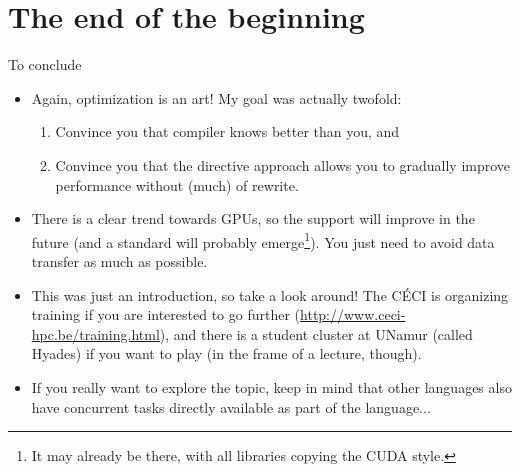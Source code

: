 \section{The end of the beginning}

\begin{frame}{To conclude}
	\begin{itemize}
		\item Again, optimization is an art! My goal was actually twofold:\begin{enumerate}
			\item Convince you that compiler knows better than you, and
			\item Convince you that the directive approach allows you to gradually improve performance without (much) of rewrite.
		\end{enumerate}
		\item There is a clear trend towards GPUs, so the support will improve in the future (and a standard will probably emerge\footnote{It may already be there, with all libraries copying the CUDA style.}). You just need to avoid data transfer as much as possible.
		\item This was just an introduction, so take a look around! The CÉCI is organizing training if you are interested to go further (\url{http://www.ceci-hpc.be/training.html}), and there is a student cluster at UNamur (called Hyades) if you want to play (in the frame of a lecture, though).
		\item If you really want to explore the topic, keep in mind that other languages also have concurrent tasks directly available as part of the language...
		\end{itemize}
\end{frame}
